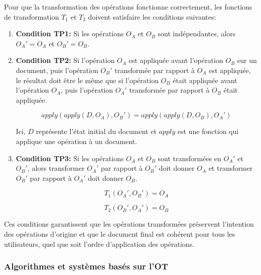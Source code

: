 Pour que la transformation des opérations fonctionne correctement, les fonctions de transformation $T_1$ et $T_2$ doivent satisfaire les conditions suivantes:

\begin{enumerate}
    \item \textbf{Condition TP1:} Si les opérations $O_A$ et $O_B$ sont indépendantes, alors $O_A' = O_A$ et $O_B' = O_B$.
    \item \textbf{Condition TP2:} Si l'opération $O_A$ est appliquée avant l'opération $O_B$ sur un document, puis l'opération $O_B'$ transformée par rapport à $O_A$ est appliquée, le résultat doit être le même que si l'opération $O_B$ était appliquée avant l'opération $O_A$, puis l'opération $O_A'$ transformée par rapport à $O_B$ était appliquée.

          \begin{equation}
              apply(apply(D, O_A), O_B') = apply(apply(D, O_B), O_A')
          \end{equation}

          Ici, $D$ représente l'état initial du document et $apply$ est une fonction qui applique une opération à un document.

    \item \textbf{Condition TP3:} Si les opérations $O_A$ et $O_B$ sont transformées en $O_A'$ et $O_B'$, alors transformer $O_A'$ par rapport à $O_B'$ doit donner $O_A$ et transformer $O_B'$ par rapport à $O_A'$ doit donner $O_B$.

          \begin{equation}
              T_1(O_A', O_B') = O_A
          \end{equation}

          \begin{equation}
              T_2(O_B', O_A') = O_B
          \end{equation}

\end{enumerate}

Ces conditions garantissent que les opérations transformées préservent l'intention des opérations d'origine et que le document final est cohérent pour tous les utilisateurs, quel que soit l'ordre d'application des opérations.

\subsubsection{Algorithmes et systèmes basés sur l'OT}


